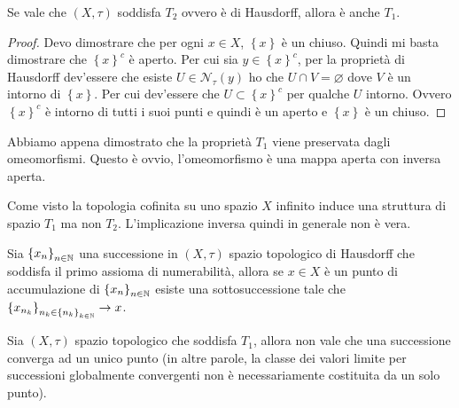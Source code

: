 \begin{theorem}
	Se vale che $(X, \tau)$ soddisfa $T_2$ ovvero è di Hausdorff, allora è anche $T_1$.
\end{theorem} 
\begin{proof}
	Devo dimostrare che per ogni $x\in X$, $\left\{x\right\}$ è un chiuso. Quindi mi basta dimostrare che $\left\{x\right\}^c$ è aperto. Per cui sia $y \in \left\{x\right\}^c$, per la proprietà di Hausdorff dev'essere che esiste $U \in \mathcal{N}_\tau(y)$ ho che $U \cap V = \varnothing$ dove $V$ è un intorno di $\left\{x\right\}$. Per cui dev'essere che $U \subset \left\{x\right\}^c$ per qualche $U$ intorno. Ovvero $\left\{x\right\}^c$ è intorno di tutti i suoi punti e quindi è un aperto e $\left\{x\right\}$ è un chiuso.
\end{proof}
\begin{remark} Abbiamo appena dimostrato che la proprietà $T_1$ viene preservata dagli omeomorfismi. Questo è ovvio, l'omeomorfismo è una mappa aperta con inversa aperta.
\end{remark}
\begin{remark} Come visto la topologia cofinita su uno spazio $X$ infinito induce una struttura di spazio $T_1$ ma non $T_2$. L'implicazione inversa quindi in generale non è vera.
\end{remark}

\begin{theorem}
	Sia $\left\{x_n\right\}_{n\in \mathbb{N}}$ una successione in $(X,\tau)$ spazio topologico di Hausdorff che soddisfa il primo assioma di numerabilità, allora se $x \in X$ è un punto di accumulazione di $\left\{x_n\right\}_{n\in \mathbb{N}}$ esiste una sottosuccessione tale che $\left\{x_{n_k}\right\}_{n_k \in \left\{n_k\right\}_{k \in \mathbb{N}}} \rightarrow x$. 
\end{theorem}

\begin{remark}
	Sia $(X, \tau)$ spazio topologico che soddisfa $T_1$, allora non vale che una successione converga ad un unico punto (in altre parole, la classe dei valori limite per successioni globalmente convergenti non è necessariamente costituita da un solo punto).
\end{remark}

